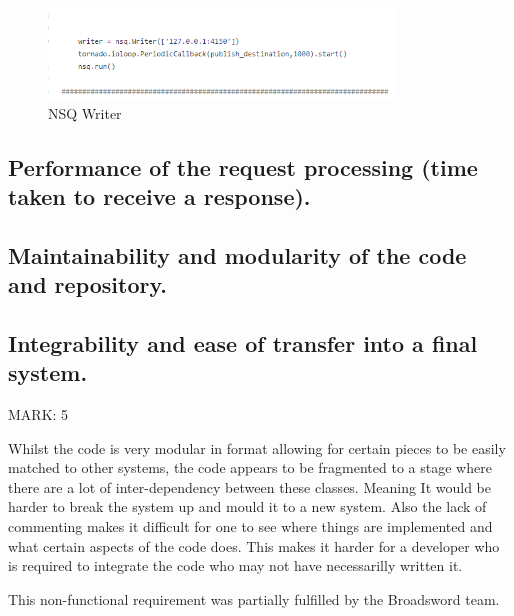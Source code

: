 \documentclass{article}
\begin{document}
\begin{figure}[ht]
  \includegraphics[width=350px]{Images/concurrency2.PNG}
  \caption{NSQ Writer}
  \label{NSQ Writer}
\end{figure}

\subsection{Performance of the request processing (time taken to receive a response).}

\subsection{Maintainability and modularity of the code and repository.}

\subsection{Integrability and ease of transfer into a final system.}
\begin{flushleft}
MARK: 5
\end{flushleft}

\begin{flushleft}
Whilst the code is very modular in format allowing for certain pieces to be easily matched to other systems, the code appears to be fragmented to a stage where there are a lot of inter-dependency between these classes. Meaning It would be harder to break the system up and mould it to a new system. Also the lack of commenting makes it difficult for one to see where things are implemented and what certain aspects of the code does. This makes it harder for a developer who is required to integrate the code who may not have necessarilly written it.
\end{flushleft}

\begin{flushleft}
This non-functional requirement was partially fulfilled by the Broadsword team.
\end{flushleft}
\end{document}
